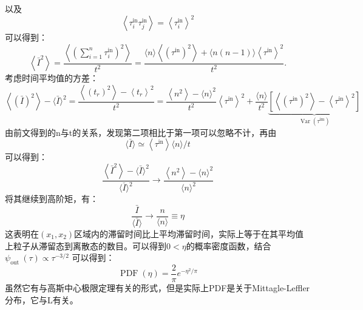 以及
\begin{equation}
\left\langle\tau_{i}^{\mathrm{in}} \tau_{j}^{\mathrm{in}}\right\rangle=\left\langle\tau_{i}^{\mathrm{in}}\right\rangle^{2}
\end{equation}
可以得到：
\begin{equation}
\left\langle\bar{I}^{2}\right\rangle =\frac{\left\langle\left(\sum_{i=1}^{n} \tau_{i}^{\mathrm{in}}\right)^{2}\right\rangle}{t^{2}}
=\frac{\langle n\rangle\left\langle\left(\tau^{\mathrm{in}}\right)^{2}\right\rangle+\langle n(n-1)\rangle\left\langle\tau^{\mathrm{in}}\right\rangle^{2}}{t^{2}} .
\end{equation}
考虑时间平均值的方差：
\begin{equation}
\left\langle(\bar{I})^{2}\right\rangle-\langle\bar{I}\rangle^{2}=\frac{\left\langle\left(t_{r}\right)^{2}\right\rangle-\left\langle t_{r}\right\rangle^{2}}{t^{2}}=\frac{\left\langle n^{2}\right\rangle-\langle n\rangle^{2}}{t^{2}}\left\langle\tau^{\mathrm{in}}\right\rangle^{2}+\frac{\langle n\rangle}{t^{2}} \underbrace{\left[\left\langle\left(\tau^{\mathrm{in}}\right)^{2}\right\rangle-\left\langle\tau^{\mathrm{in}}\right\rangle^{2}\right]}_{\operatorname{Var}\left(\tau^{\mathrm{im}}\right)}
\end{equation}
由前文得到的n与t的关系，发现第二项相比于第一项可以忽略不计，再由
\begin{equation}
\langle\bar{I}\rangle \simeq\left\langle\tau^{\mathrm{in}}\right\rangle\langle n\rangle / t
\end{equation}
可以得到：
\begin{equation}
\frac{\left\langle\bar{I}^{2}\right\rangle-\langle\bar{I}\rangle^{2}}{\langle\bar{I}\rangle^{2}} \rightarrow \frac{\left\langle n^{2}\right\rangle-\langle n\rangle^{2}}{\langle n\rangle^{2}}
\end{equation}
将其继续到高阶矩，有：
\begin{equation}
\frac{\bar{I}}{\langle\bar{I}\rangle} \rightarrow \frac{n}{\langle n\rangle} \equiv \eta
\end{equation}
这表明在$\left(x_{1}, x_{2}\right)$区域内的滞留时间比上平均滞留时间，实际上等于在其平均值上粒子从滞留态到离散态的数目。可以得到$0<\eta $的概率密度函数\cite{godrecheStatisticsOccupationTime2001}，结合$\psi_{\text {out }}(\tau) \propto \tau^{-3 / 2}$
可以得到：\begin{equation}
\operatorname{PDF}(\eta)=\frac{2}{\pi} e^{-\eta^{2} / \pi}
\end{equation}
虽然它有与高斯中心极限定理有关的形式，但是实际上PDF是关于Mittagle-Leffler分布，它与L有关。
